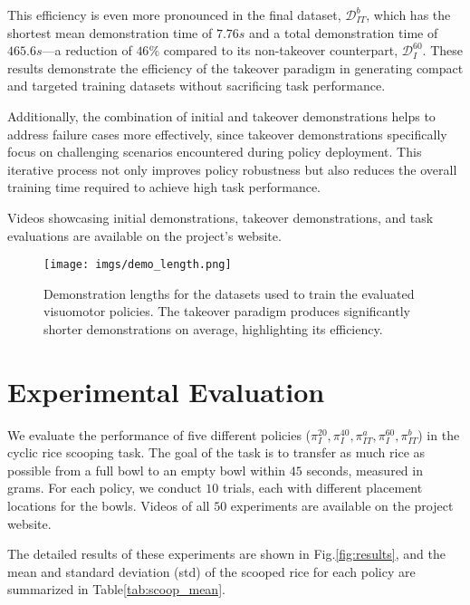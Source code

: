 This efficiency is even more pronounced in the final dataset, $\mathcal{D}_{IT}^{b}$, which has the shortest mean demonstration time of $7.76s$ and a total demonstration time of $465.6s$—a reduction of $46\%$ compared to its non-takeover counterpart, $\mathcal{D}_I^{60}$. These results demonstrate the efficiency of the takeover paradigm in generating compact and targeted training datasets without sacrificing task performance.

Additionally, the combination of initial and takeover demonstrations helps to address failure cases more effectively, since takeover demonstrations specifically focus on challenging scenarios encountered during policy deployment. This iterative process not only improves policy robustness but also reduces the overall training time required to achieve high task performance.

Videos showcasing initial demonstrations, takeover demonstrations, and task evaluations are available on the project’s website.

\begin{figure}[t] \centering \texttt{[image: imgs/demo\_length.png]} \caption{Demonstration lengths for the datasets used to train the evaluated visuomotor policies. The takeover paradigm produces significantly shorter demonstrations on average, highlighting its efficiency.} \label{fig:demo_length} \end{figure}








\section{Experimental Evaluation}

We evaluate the performance of five different policies ($\pi_I^{20}, \pi_I^{40}, \pi_{IT}^a, \pi_I^{60}, \pi_{IT}^b$) in the cyclic rice scooping task. The goal of the task is to transfer as much rice as possible from a full bowl to an empty bowl within $45$ seconds, measured in grams. For each policy, we conduct $10$ trials, each with different placement locations for the bowls. Videos of all $50$ experiments are available on the project website.

The detailed results of these experiments are shown in Fig.\ref{fig:results}, and the mean and standard deviation (std) of the scooped rice for each policy are summarized in Table\ref{tab:scoop_mean}.

